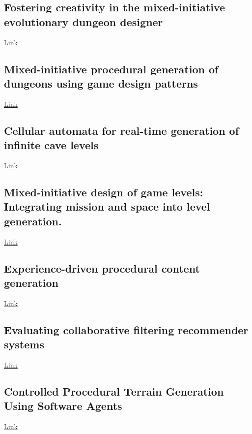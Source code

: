 \documentclass[journal]{IEEEtran}
\begin{document}
\subsection{Fostering creativity in the mixed-initiative evolutionary dungeon designer\cite{alvarez2018fostering}}
\href{https://muep.mau.se/bitstream/handle/2043/25889/Nolasco_O%CC%88sterman.pdf?sequence=1&isAllowed=y}{Link}

\subsection{Mixed-initiative procedural generation of dungeons using game design patterns\cite{baldwin2017mixed}}
\href{https://muep.mau.se/bitstream/handle/2043/22832/baldwin-holmberg_mixed-initiative-procedural_FINAL.pdf?sequence=2&isAllowed=y}{Link}

\subsection{Cellular automata for real-time generation of infinite cave levels\cite{johnson2010cellular}}
\href{https://dl-acm-org.ezproxy.falmouth.ac.uk/citation.cfm?id=1814266}{Link}
\subsection{Mixed-initiative  design  of game levels: Integrating mission and space into level generation.\cite{karavolos2015mixed}}
\href{http://www.fdg2015.org/papers/fdg2015_paper_25.pdf}{Link}

\subsection{Experience-driven procedural content generation\cite{yannakakis2011experience}}
\href{https://ieeexplore-ieee-org.ezproxy.falmouth.ac.uk/document/5740836}{Link}
\subsection{Evaluating collaborative filtering recommender systems\cite{herlocker2004evaluating}}
\href{https://dl-acm-org.ezproxy.falmouth.ac.uk/ft_gateway.cfm?id=963772&ftid=247769&dwn=1&CFID=19451816&CFTOKEN=60d77465fa35c5bb-88408FAD-D71F-E81D-FF436ADBE71D45CA}{Link}

\subsection{Controlled Procedural Terrain Generation Using Software Agents\cite{doran2010controlled}}
\href{https://ieeexplore-ieee-org.ezproxy.falmouth.ac.uk/document/5454273}{Link}
\end{document}
